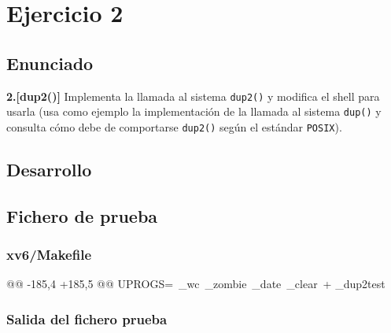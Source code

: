 \section{Ejercicio 2}
\subsection{Enunciado}
\begin{ejer}
    \textbf{2.[dup2()]} Implementa la llamada al sistema \texttt{dup2()} y modifica el shell
para usarla (usa como ejemplo la implementación de la llamada al sistema \texttt{dup()} y consulta cómo
debe de comportarse \texttt{dup2()} según el estándar \texttt{POSIX}).
\end{ejer}
\subsection{Desarrollo}


\subsection{Fichero de prueba}
\subsubsection{xv6/Makefile}
\begin{listing}
@@ -185,4 +185,5 @@ UPROGS=\
    _wc\
    _zombie\
    _date\
    _clear\
+   _dup2test\
\end{listing}
\subsubsection{Salida del fichero prueba}
